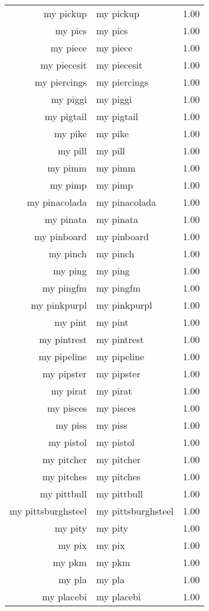 \begin{table}[ht]
\begin{tabular}{rlr}
  my pickup & my pickup & 1.00 \\ 
  my pics & my pics & 1.00 \\ 
  my piece & my piece & 1.00 \\ 
  my piecesit & my piecesit & 1.00 \\ 
  my piercings & my piercings & 1.00 \\ 
  my piggi & my piggi & 1.00 \\ 
  my pigtail & my pigtail & 1.00 \\ 
  my pike & my pike & 1.00 \\ 
  my pill & my pill & 1.00 \\ 
  my pimm & my pimm & 1.00 \\ 
  my pimp & my pimp & 1.00 \\ 
  my pinacolada & my pinacolada & 1.00 \\ 
  my pinata & my pinata & 1.00 \\ 
  my pinboard & my pinboard & 1.00 \\ 
  my pinch & my pinch & 1.00 \\ 
  my ping & my ping & 1.00 \\ 
  my pingfm & my pingfm & 1.00 \\ 
  my pinkpurpl & my pinkpurpl & 1.00 \\ 
  my pint & my pint & 1.00 \\ 
  my pintrest & my pintrest & 1.00 \\ 
  my pipeline & my pipeline & 1.00 \\ 
  my pipster & my pipster & 1.00 \\ 
  my pirat & my pirat & 1.00 \\ 
  my pisces & my pisces & 1.00 \\ 
  my piss & my piss & 1.00 \\ 
  my pistol & my pistol & 1.00 \\ 
  my pitcher & my pitcher & 1.00 \\ 
  my pitches & my pitches & 1.00 \\ 
  my pittbull & my pittbull & 1.00 \\ 
  my pittsburghsteel & my pittsburghsteel & 1.00 \\ 
  my pity & my pity & 1.00 \\ 
  my pix & my pix & 1.00 \\ 
  my pkm & my pkm & 1.00 \\ 
  my pla & my pla & 1.00 \\ 
  my placebi & my placebi & 1.00 \\ 

\end{tabular}
\end{table}
